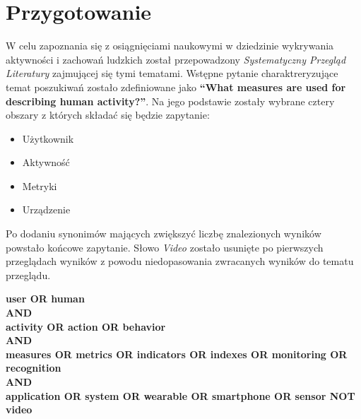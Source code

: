 \section{Przygotowanie}
W celu zapoznania się z osiągnięciami naukowymi w dziedzinie wykrywania aktywności i zachowań ludzkich został przepowadzony \textit{Systematyczny Przegląd Literatury} zajmującej się tymi tematami. Wstępne pytanie charaktreryzujące temat poszukiwań zostało zdefiniowane jako \textbf{``What measures are used for describing human activity?''}. Na jego podstawie zostały wybrane cztery obszary z których składać się będzie zapytanie:
\begin{itemize}
    \item Użytkownik
    \item Aktywność
    \item Metryki
    \item Urządzenie
\end{itemize}

Po dodaniu synonimów mających zwiększyć liczbę znalezionych wyników powstało końcowe zapytanie. Słowo \textit{Video} zostało usunięte po pierwszych przeglądach wyników z powodu niedopasowania zwracanych wyników do tematu przeglądu.
\begin{center}
	\begin{minipage}{0.85\linewidth}
	\textbf{user OR human\\
	AND\\
	activity OR action OR behavior\\
	AND\\
	measures OR metrics OR indicators OR indexes OR monitoring OR recognition\\
	AND\\
	application OR system OR wearable OR smartphone OR sensor NOT video}
	\end{minipage}
\end{center}

